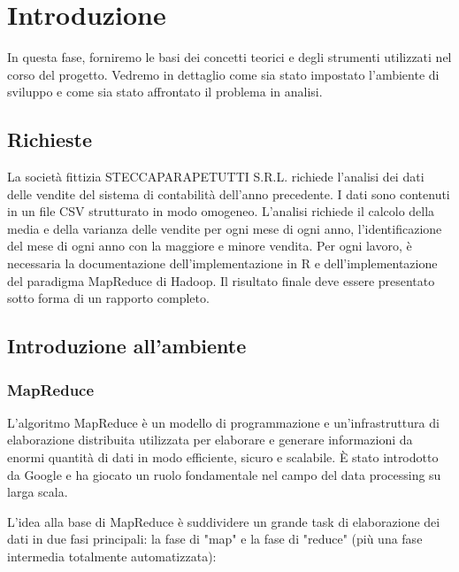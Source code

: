 \section{Introduzione}
In questa fase, forniremo le basi dei concetti teorici e degli strumenti utilizzati nel corso del progetto. Vedremo in dettaglio come sia stato impostato l'ambiente di sviluppo e come sia stato affrontato il problema in analisi.

\subsection{Richieste}
La società fittizia STECCAPARAPETUTTI S.R.L. richiede l'analisi dei dati delle vendite del sistema di contabilità dell'anno precedente. I dati sono contenuti in un file CSV strutturato in modo omogeneo. L'analisi richiede il calcolo della media e della varianza delle vendite per ogni mese di ogni anno, l'identificazione del mese di ogni anno con la maggiore e minore vendita. Per ogni lavoro, è necessaria la documentazione dell'implementazione in R e dell'implementazione del paradigma MapReduce di Hadoop. Il risultato finale deve essere presentato sotto forma di un rapporto completo.

\subsection{Introduzione all’ambiente}
\subsubsection{MapReduce}
L'algoritmo MapReduce è un modello di programmazione e un'infrastruttura di elaborazione distribuita utilizzata per elaborare e generare informazioni da enormi quantità di dati in modo efficiente, sicuro e scalabile. È stato introdotto da Google\cite{mapReduceGoogle} e ha giocato un ruolo fondamentale nel campo del data processing su larga scala.

L'idea alla base di MapReduce è suddividere un grande task di elaborazione dei dati in due fasi principali: la fase di "map" e la fase di "reduce" (più una fase intermedia totalmente automatizzata):


